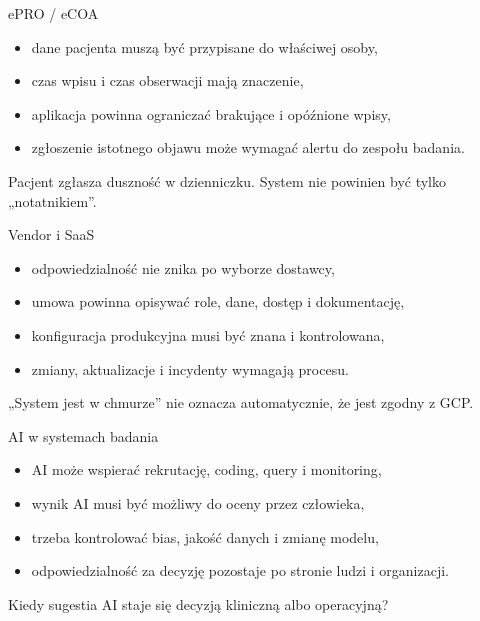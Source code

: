 \begin{frame}{ePRO / eCOA}
  \begin{itemize}
    \item dane pacjenta muszą być przypisane do właściwej osoby,
    \item czas wpisu i czas obserwacji mają znaczenie,
    \item aplikacja powinna ograniczać brakujące i opóźnione wpisy,
    \item zgłoszenie istotnego objawu może wymagać alertu do zespołu badania.
  \end{itemize}

  \vspace{0.3cm}

  \begin{WarningBox}
    Pacjent zgłasza duszność w dzienniczku. System nie powinien być tylko „notatnikiem”.
  \end{WarningBox}
\end{frame}

\begin{frame}{Vendor i SaaS}
  \begin{itemize}
    \item odpowiedzialność nie znika po wyborze dostawcy,
    \item umowa powinna opisywać role, dane, dostęp i dokumentację,
    \item konfiguracja produkcyjna musi być znana i kontrolowana,
    \item zmiany, aktualizacje i incydenty wymagają procesu.
  \end{itemize}

  \vspace{0.3cm}

  \begin{WarningBox}
    „System jest w chmurze” nie oznacza automatycznie, że jest zgodny z GCP.
  \end{WarningBox}
\end{frame}

\begin{frame}{AI w systemach badania}
  \begin{itemize}
    \item AI może wspierać rekrutację, coding, query i monitoring,
    \item wynik AI musi być możliwy do oceny przez człowieka,
    \item trzeba kontrolować bias, jakość danych i zmianę modelu,
    \item odpowiedzialność za decyzję pozostaje po stronie ludzi i organizacji.
  \end{itemize}

  \vspace{0.3cm}

  \begin{QuestionBox}
    Kiedy sugestia AI staje się decyzją kliniczną albo operacyjną?
  \end{QuestionBox}
\end{frame}

